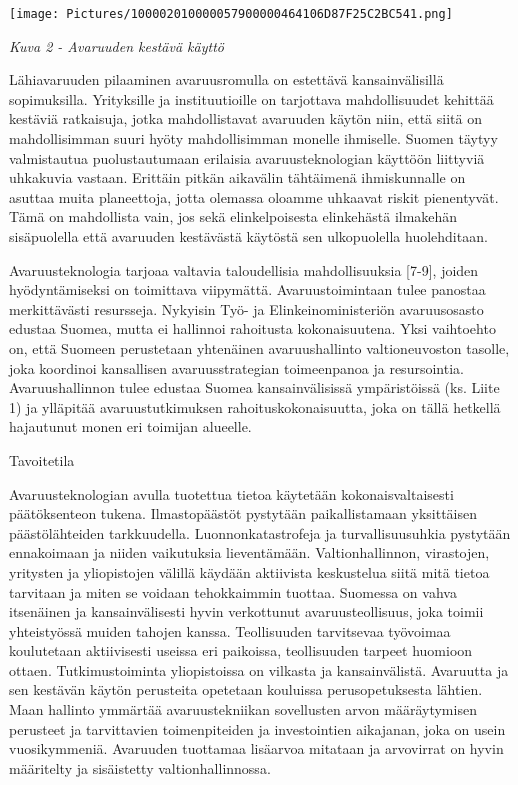 \texttt{[image: Pictures/100002010000057900000464106D87F25C2BC541.png]}

\emph{Kuva 2 - Avaruuden kestävä käyttö}

Lähiavaruuden pilaaminen avaruusromulla on estettävä kansainvälisillä
sopimuksilla. Yrityksille ja instituutioille on tarjottava
mahdollisuudet kehittää kestäviä ratkaisuja, jotka mahdollistavat
avaruuden käytön niin, että siitä on mahdollisimman suuri hyöty
mahdollisimman monelle ihmiselle. Suomen täytyy valmistautua
puolustautumaan erilaisia avaruusteknologian käyttöön liittyviä
uhkakuvia vastaan. Erittäin pitkän aikavälin tähtäimenä ihmiskunnalle on
asuttaa muita planeettoja, jotta olemassa oloamme uhkaavat riskit
pienentyvät. Tämä on mahdollista vain, jos sekä elinkelpoisesta
elinkehästä ilmakehän sisäpuolella että avaruuden kestävästä käytöstä
sen ulkopuolella huolehditaan.

Avaruusteknologia tarjoaa valtavia taloudellisia mahdollisuuksia
{[}7-9{]}, joiden hyödyntämiseksi on toimittava viipymättä.
Avaruustoimintaan tulee panostaa merkittävästi resursseja. Nykyisin Työ-
ja Elinkeinoministeriön avaruusosasto edustaa Suomea, mutta ei hallinnoi
rahoitusta kokonaisuutena. Yksi vaihtoehto on, että Suomeen perustetaan
yhtenäinen avaruushallinto valtioneuvoston tasolle, joka koordinoi
kansallisen avaruusstrategian toimeenpanoa ja resursointia.
Avaruushallinnon tulee edustaa Suomea kansainvälisissä ympäristöissä
(ks. Liite 1) ja ylläpitää avaruustutkimuksen rahoituskokonaisuutta,
joka on tällä hetkellä hajautunut monen eri toimijan alueelle.

Tavoitetila

\protect\hypertarget{anchor-3}{}{}Avaruusteknologian avulla tuotettua
tietoa käytetään kokonaisvaltaisesti päätöksenteon tukena.
Ilmastopäästöt pystytään paikallistamaan yksittäisen päästölähteiden
tarkkuudella. Luonnonkatastrofeja ja turvallisuusuhkia pystytään
ennakoimaan ja niiden vaikutuksia lieventämään. Valtionhallinnon,
virastojen, yritysten ja yliopistojen välillä käydään aktiivista
keskustelua siitä mitä tietoa tarvitaan ja miten se voidaan tehokkaimmin
tuottaa. Suomessa on vahva itsenäinen ja kansainvälisesti hyvin
verkottunut avaruusteollisuus, joka toimii yhteistyössä muiden tahojen
kanssa. Teollisuuden tarvitsevaa työvoimaa koulutetaan aktiivisesti
useissa eri paikoissa, teollisuuden tarpeet huomioon ottaen.
Tutkimustoiminta yliopistoissa on vilkasta ja kansainvälistä. Avaruutta
ja sen kestävän käytön perusteita opetetaan kouluissa perusopetuksesta
lähtien. Maan hallinto ymmärtää avaruustekniikan sovellusten arvon
määräytymisen perusteet ja tarvittavien toimenpiteiden ja investointien
aikajanan, joka on usein vuosikymmeniä. Avaruuden tuottamaa lisäarvoa
mitataan ja arvovirrat on hyvin määritelty ja sisäistetty
valtionhallinnossa.

